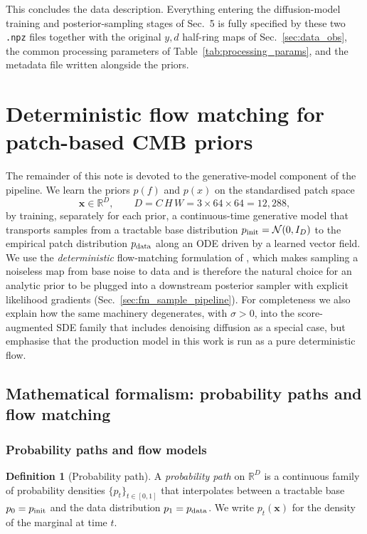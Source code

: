 \documentclass[11pt]{article}
\DeclareRobustCommand{\xvec}{\bm{x}}
\newcommand{\pinit}{p_{\rm init}}
\newcommand{\pdata}{p_{\rm data}}
\newcommand{\Ndata}{\mathbb{R}^{D}}
\theoremstyle{definition}
\newtheorem{definition}{Definition}[section]
\begin{document}
This concludes the data description. Everything entering the diffusion-model training and posterior-sampling stages of Sec.~5 is fully specified by these two \texttt{.npz} files together with the original $y,d$ half-ring maps of Sec.~\ref{sec:data_obs}, the common processing parameters of Table~\ref{tab:processing_params}, and the metadata file written alongside the priors.





\section{Deterministic flow matching for patch-based CMB priors}
\label{sec:fm}

The remainder of this note is devoted to the generative-model component of the pipeline. We learn the priors $p(f)$ and $p(x)$ on the standardised patch space
\[
  \xvec\in\Ndata,\qquad D = C\,H\,W = 3\!\times\!64\!\times\!64 = 12{,}288,
\]
by training, separately for each prior, a continuous-time generative model that transports samples from a tractable base distribution $\pinit=\mathcal N(0,I_D)$ to the empirical patch distribution $\pdata$ along an ODE driven by a learned vector field. We use the \emph{deterministic} flow-matching formulation of \cite{lipman2023flowmatching,liu2022rectified,albergo2023interpolants}, which makes sampling a noiseless map from base noise to data and is therefore the natural choice for an analytic prior to be plugged into a downstream posterior sampler with explicit likelihood gradients (Sec.~\ref{sec:fm_sample_pipeline}). For completeness we also explain how the same machinery degenerates, with $\sigma>0$, into the score-augmented SDE family that includes denoising diffusion as a special case, but emphasise that the production model in this work is run as a pure deterministic flow.

\subsection{Mathematical formalism: probability paths and flow matching}
\label{sec:fm_formalism}

\subsubsection{Probability paths and flow models}

\begin{definition}[Probability path]
\label{def:prob_path}
A \emph{probability path} on $\Ndata$ is a continuous family of probability densities $\{p_t\}_{t\in[0,1]}$ that interpolates between a tractable base $p_0=\pinit$ and the data distribution $p_1=\pdata$. We write $p_t(\xvec)$ for the density of the marginal at time $t$.
\end{definition}
\end{document}
